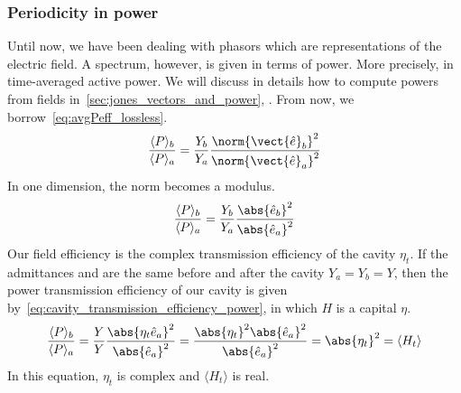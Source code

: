 \subsubsection{Periodicity in power}
\label{sec:periodicity_in_power}
Until now, we have been dealing with phasors which are representations of the electric field.
A spectrum, however, is given in terms of power.
More precisely, in time-averaged active power.
We will discuss in details how to compute powers from fields in~\vref{sec:jones_vectors_and_power}, \textit{}.
From now, we borrow~\vref{eq:avgPeff_lossless}.
\begin{equation*}
    \frac{\langle P \rangle_b}{\langle P \rangle_a}
    =
    \frac{Y_b}{Y_a}
    \frac{\norm{\vect{\hat{e}}_b}^2}{\norm{\vect{\hat{e}}_a}^2}
    \label{eq:avgPeff_lossless}
\end{equation*}
In one dimension, the norm becomes a modulus.
\begin{equation*}
    \frac{\langle P \rangle_b}{\langle P \rangle_a}
    =
    \frac{Y_b}{Y_a}
    \frac{\abs{\hat{e}_b}^2}{\abs{\hat{e}_a}^2}
    \label{eq:avgPeff_lossless}
\end{equation*}
Our field efficiency is the complex transmission efficiency of the cavity $\eta_t$.
If the admittances and are the same before and after the cavity $Y_a=Y_b=Y$, then the power transmission efficiency of our cavity is given by~\cref{eq:cavity_transmission_efficiency_power},
in which $H$ is a capital $\eta$.
\begin{equation}
        \frac{\langle P \rangle_b}{\langle P \rangle_a}
        =
        \frac{Y}{Y}
        \frac{
            \abs{\eta_t\hat{e}_a}^2
        }{
            \abs{\hat{e}_a}^2
        }
        =
        \frac{
            \abs{\eta_t}^2 \abs{\hat{e}_a}^2
        }{
            \abs{\hat{e}_a}^2
        }
        =
        \abs{\eta_t}^2
        =
        \langle H_t \rangle
        \label{eq:cavity_transmission_efficiency_power}
\end{equation}
In this equation, $\eta_t$ is complex and $\langle H_t \rangle$ is real.

